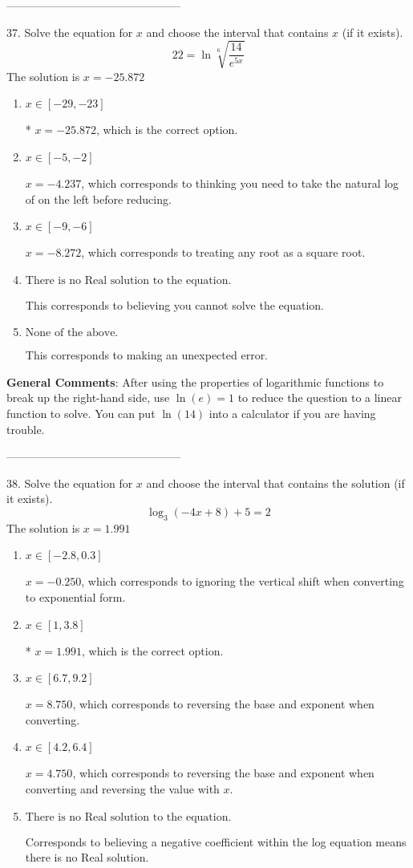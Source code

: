 \documentclass{extbook}[14pt]
\begin{document}
-----------------------------------------------

37.  Solve the equation for $x$ and choose the interval that contains $x$ (if it exists).
\[  22 = \ln{\sqrt[6]{\frac{14}{e^{5x}}}} \] 
The solution is $ x = -25.872 $ 

\begin{enumerate}[label=\Alph*.] 
\item $ x \in [-29, -23] $ 

 * $x = -25.872$, which is the correct option. 
\item $ x \in [-5, -2] $ 

 $x = -4.237$, which corresponds to thinking you need to take the natural log of on the left before reducing. 
\item $ x \in [-9, -6] $ 

 $x = -8.272$, which corresponds to treating any root as a square root. 
\item $ \text{There is no Real solution to the equation.} $ 

 This corresponds to believing you cannot solve the equation. 
\item $ \text{None of the above.} $ 

 This corresponds to making an unexpected error. 
\end{enumerate} 
 
\textbf{General Comments}: After using the properties of logarithmic functions to break up the right-hand side, use $\ln(e) = 1$ to reduce the question to a linear function to solve. You can put $\ln(14)$ into a calculator if you are having trouble.

-----------------------------------------------

38. Solve the equation for $x$ and choose the interval that contains the solution (if it exists).
\[ \log_{3}{(-4x+8)}+5 = 2 \] 
The solution is $ x = 1.991 $ 

\begin{enumerate}[label=\Alph*.] 
\item $ x \in [-2.8, 0.3] $ 

 $x = -0.250$, which corresponds to ignoring the vertical shift when converting to exponential form. 
\item $ x \in [1, 3.8] $ 

 * $x = 1.991$, which is the correct option. 
\item $ x \in [6.7, 9.2] $ 

 $x = 8.750$, which corresponds to reversing the base and exponent when converting. 
\item $ x \in [4.2, 6.4] $ 

 $x = 4.750$, which corresponds to reversing the base and exponent when converting and reversing the value with $x$. 
\item $ \text{There is no Real solution to the equation.} $ 

 Corresponds to believing a negative coefficient within the log equation means there is no Real solution. 
\end{enumerate} 
 
\end{document}
